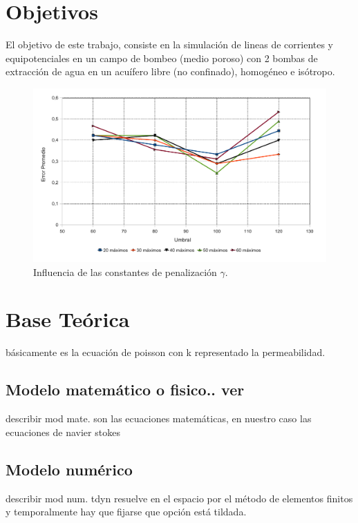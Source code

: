\documentclass[10pt,a4paper,final]{article}
\begin{document}
\section{Objetivos}
El objetivo de este trabajo, consiste en la simulación de lineas de corrientes y equipotenciales en un campo de bombeo (medio poroso) con 2 bombas de extracción de agua en un acuífero libre (no confinado), homogéneo e isótropo.
\begin{figure}[tbhp]
\centerline{\includegraphics[scale=0.75]{img/estadistica_noche_iguales}}
\caption{Influencia de las constantes de penalización $\gamma$.}
\label{fig2}
\end{figure}
\section{Base Teórica}
básicamente es la ecuación de poisson con k
representado la permeabilidad.
\subsection{Modelo matemático o fisico.. ver}
describir mod mate.
 son las ecuaciones matemáticas, en nuestro caso las
ecuaciones de navier stokes
%
\subsection{Modelo numérico}
describir mod num.
tdyn resuelve en el espacio por el método de
elementos finitos y temporalmente hay que fijarse que opción está
tildada.
\end{document}
